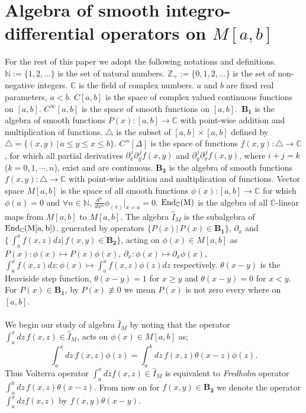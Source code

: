 \documentclass[10pt]{article}
\newcommand{\be}{\begin{equation}}
\newcommand{\ee}{\end{equation}}
\newcommand{\nn}{\nonumber}
\newcommand{\rd}{\partial}
\newcommand{\mc}{{\mathbb C}}
\newcommand{\mIm}{\widehat{I}_{M}}
\newcommand{\End}{\rm End }
\begin{document}

 \section {Algebra of smooth integro-differential operators on $M[a,b]$}
 \label{melika}

For the rest of this paper we adopt the following notations and definitions.\\

 $\mathbb{N} :=\{1, 2, \ldots \}$ is the set of natural numbers.
 $\mathbb{Z}_{+} :=\{0,1, 2, \ldots \}$ is the set of non-negative
 integers.
 $\mc$ is the
field of complex numbers. $a$ and $b$ are fixed real parameters,
$a<b$. $C[a,b]$ is the space of complex valued continuous functions
on $[a,b]$. $C^{\infty}[a,b]$ is the space of smooth functions on
$[a,b]$. \,$\boldsymbol{B_1}$ is the algebra of smooth functions
$P(x):[a,b] \to \mc$ with point-wise addition and multiplication of
functions. $\triangle$ is the subset of $[a,b] \times [a,b]$ defined
by $\triangle=\{(x,y)\,|\, a \leq y \leq x\leq b \}$.
$C^{\,n}[\Delta]$ is the space of functions $f(x,y):\triangle \to
\mc$, for which all partial derivatives
$\rd^{\,i}_{x}\rd^{\,j}_{y}f(x,y)$ and
$\rd^{\,i}_{y}\rd^{\,j}_{x}f(x,y)$, where $i+j=k$ ($k=0,1,\cdots,
n$), exist and are continuous. $\boldsymbol {B_2}$ is the algebra of
smooth functions $f(x,y):\triangle \to \mc$ with point-wise addition
and multiplication of functions. Vector space $M[a,b]$ is the space
of all smooth functions $\phi(x):[a,b]\to\mc$ for which $\phi(a)=0$
and $\forall n\in \mathbb{N}$, $\frac{d^n}{dx^n}\phi_(x)|_{x=a}=0$.
  $\End_\mc(M)$ is the algebra of all $\mc$-linear
maps from $M[a,b]$ to $M[a,b]$. The algebra $\mIm$ is the subalgebra
of $\End_\mc(M[a,b])$, generated by operators $\{ P(x) |\,P(x)\in
{\boldsymbol{B_1}}\}$, $\rd_{x}$ and $\{ \,\int^{x}_{a} f(x,z) dz
|\,f(x,y)\in \boldsymbol{B_2}\}$, acting on $\phi(x)\in M[a,b]$ as
 $P(x):\phi(x) \mapsto P(x) \phi(x)$, $ \rd_{x}:\phi(x) \mapsto \rd_{x}\phi(x)$,
  $\int^{x}_{a} f(x,z) dz:\phi(x) \mapsto \int^{x}_{a} f(x,z) \phi(z) dz$
  respectively. $\theta(x-y)$ is the Heaviside step function, $\theta(x-y)=1$ for $x\geq y$ and  $\theta(x-y)=0$ for $x<
  y$. For $P(x)\in {\boldsymbol{B_1}}$, by $P(x)\not\equiv 0$ we mean $P(x)$ is not
zero
 every where on $[a,b]$.\\\\

We begin our study of algebra $\mIm$ by noting that the operator
 $\int^{x}_{a} dz \,f(x,z)\in \mIm$, acts on $\phi(x)\in M[a,b]$ as;
\be \int^{x}_{a} dz\,f(x,z)\phi(z)= \int^{b}_{a} dz\,
f(x,z)\theta(x-z)\phi(z).\nn\ee Thus Volterra operator $\int^{x}_{a}
dz f(x,z)\in \mIm$ is equivalent to {\em Fredholm } operator
$\int^{b}_{a} dz\,f(x,z)\theta(x-z)$. From now on for $f(x,y)\in
\boldsymbol{B_2}$ we denote the operator $\int^{x}_{a} dz f(x,z)$ by
$f(x,y)\theta(x-y)$.
\end{document}
